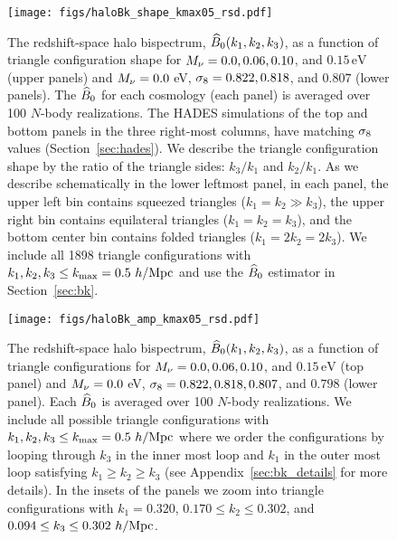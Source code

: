 \begin{figure}
\begin{center}
    \texttt{[image: figs/haloBk\_shape\_kmax05\_rsd.pdf]} 
    \caption{The redshift-space halo bispectrum, $\widehat{B}_0(k_1, k_2, k_3)$, as a 
    function of triangle configuration shape for $M_\nu = 0.0, 0.06, 0.10$, 
    and $0.15\,\mathrm{eV}$ (upper panels) and $M_\nu=0.0$ eV, $\sigma_8 = 0.822, 0.818$, and 
    $0.807$ (lower panels). The $\widehat{B}_0$ for each cosmology (each panel) is 
    averaged over 100 $N$-body realizations. The HADES simulations of the top 
    and bottom panels in the three right-most columns, have matching $\sigma_8$ values 
    (Section~\ref{sec:hades}). We describe the triangle configuration shape 
    by the ratio of the triangle sides: $k_3/k_1$ and $k_2/k_1$. As we describe 
    schematically in the lower leftmost panel, in each panel, the upper left bin 
    contains squeezed triangles ($k_1 = k_2 \gg k_3$), the upper right bin 
    contains equilateral triangles ($k_1 = k_2 = k_3$), and the bottom center bin 
    contains folded triangles ($k_1 = 2 k_2 = 2 k_3$). We include all 1898 triangle 
    configurations with $k_1, k_2, k_3 \leq k_{\rm max} = 0.5~h/{\rm Mpc}$ and use the
    $\widehat{B}_0$ estimator in Section~\ref{sec:bk}.}
\label{fig:bk_shape}
\end{center}
\end{figure}

\begin{figure}
\begin{center}
\texttt{[image: figs/haloBk\_amp\_kmax05\_rsd.pdf]}
    \caption{The redshift-space halo bispectrum, $\widehat{B}_0(k_1, k_2, k_3)$, as a
    function of triangle configurations for $M_\nu = 0.0, 0.06, 0.10$, 
    and $0.15\,\mathrm{eV}$ (top panel) and $M_\nu = 0.0$ eV, $\sigma_8 = 0.822, 0.818, 0.807$, 
    and $0.798$ (lower panel). Each $\widehat{B}_0$ is averaged over 100 $N$-body 
    realizations. We include all possible triangle configurations 
    with $k_1, k_2, k_3 \leq k_{\rm max} = 0.5~h/{\rm Mpc}$ where we order
    the configurations by looping through $k_3$ in the inner most loop and 
    $k_1$ in the outer most loop satisfying $k_1 \geq k_2 \geq k_3$ 
    (see Appendix~\ref{sec:bk_details} for more details). In the 
    insets of the panels we zoom into triangle configurations with 
    $k_1 = 0.320$, $0.170 \leq k_2 \leq 0.302$, and 
    $0.094 \leq k_3 \leq 0.302~h/{\rm Mpc}$.}
\label{fig:bk_amp}
\end{center}
\end{figure}

